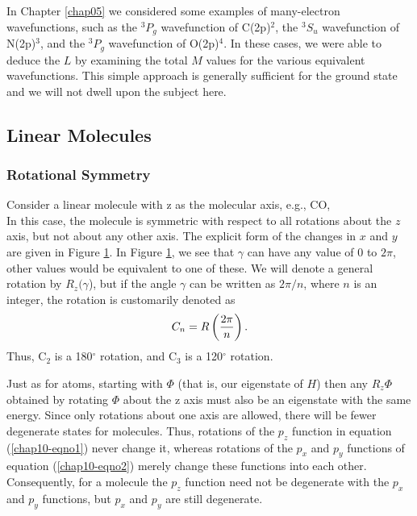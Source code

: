 In Chapter \ref{chap05} we considered some examples of many-electron
wavefunctions, such as the ${^3P}_g$ wavefunction of C(2p)$^2$, the
${^3S}_u$ wavefunction of N(2p)$^3$, and the ${^3P}_g$ wavefunction of
O(2p)$^4$.  In these cases, we were able to deduce the $L$ by
examining the total $M$ values for the various equivalent
wavefunctions.  This simple approach is generally sufficient for the
ground state and we will not dwell upon the subject here.

\subsection{Linear Molecules}

\subsubsection{Rotational Symmetry}


\begin{figure}
\caption{}
\label{chap10-fig1}
\end{figure}

Consider a linear molecule with z as the molecular axis, e.g., CO,
\begin{equation}
\end{equation}
In this case, the molecule is symmetric with respect to all rotations
about the $z$ axis, but not about any other axis.  The explicit form
of the changes in $x$ and $y$ are given in Figure \ref{chap10-fig1}.
In Figure \ref{chap10-fig1}, we see that $\gamma$ can have any value
of 0 to $2\pi$, other values would be equivalent to one of these.  We
will denote a general rotation by $R_z(\gamma$), but if the angle
$\gamma$ can be written as $2 \pi / n$, where $n$ is an integer, the
rotation is customarily denoted as
\begin{equation}
C_n = R \left( {2 \pi \over n} \right).
\end{equation}
Thus, C$_2$ is a 180$^{\circ}$ rotation, and C$_3$ is a 120$^{\circ}$ rotation.

Just as for atoms, starting with $\Phi$ (that is, our eigenstate of
$H$) then any $R_z \Phi$ obtained by rotating $\Phi$ about the z axis
must also be an eigenstate with the same energy.  Since only rotations
about one axis are allowed, there will be fewer degenerate states for
molecules.  Thus, rotations of the $p_z$ function in equation
(\ref{chap10-eqno1}) never change it, whereas rotations of the $p_x$
and $p_y$ functions of equation (\ref{chap10-eqno2}) merely change
these functions into each other.  Consequently, for a molecule the
$p_z$ function need not be degenerate with the $p_x$ and $p_y$
functions, but $p_x$ and $p_y$ are still degenerate.

